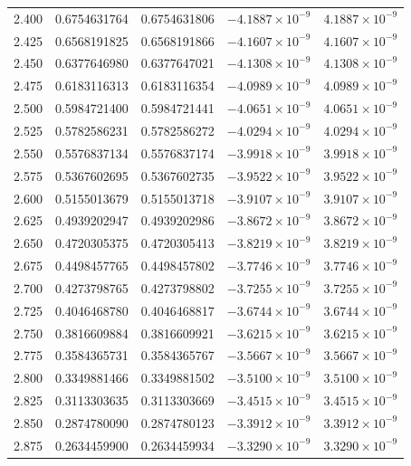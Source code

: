 \documentclass[11pt,a4paper]{article}
\begin{document}
\begin{longtable}{rrrrr}
2.400 & 0.6754631764 & 0.6754631806 & $-4.1887\times 10^{-9}$ & $4.1887\times 10^{-9}$ \\
2.425 & 0.6568191825 & 0.6568191866 & $-4.1607\times 10^{-9}$ & $4.1607\times 10^{-9}$ \\
2.450 & 0.6377646980 & 0.6377647021 & $-4.1308\times 10^{-9}$ & $4.1308\times 10^{-9}$ \\
2.475 & 0.6183116313 & 0.6183116354 & $-4.0989\times 10^{-9}$ & $4.0989\times 10^{-9}$ \\
2.500 & 0.5984721400 & 0.5984721441 & $-4.0651\times 10^{-9}$ & $4.0651\times 10^{-9}$ \\
2.525 & 0.5782586231 & 0.5782586272 & $-4.0294\times 10^{-9}$ & $4.0294\times 10^{-9}$ \\
2.550 & 0.5576837134 & 0.5576837174 & $-3.9918\times 10^{-9}$ & $3.9918\times 10^{-9}$ \\
2.575 & 0.5367602695 & 0.5367602735 & $-3.9522\times 10^{-9}$ & $3.9522\times 10^{-9}$ \\
2.600 & 0.5155013679 & 0.5155013718 & $-3.9107\times 10^{-9}$ & $3.9107\times 10^{-9}$ \\
2.625 & 0.4939202947 & 0.4939202986 & $-3.8672\times 10^{-9}$ & $3.8672\times 10^{-9}$ \\
2.650 & 0.4720305375 & 0.4720305413 & $-3.8219\times 10^{-9}$ & $3.8219\times 10^{-9}$ \\
2.675 & 0.4498457765 & 0.4498457802 & $-3.7746\times 10^{-9}$ & $3.7746\times 10^{-9}$ \\
2.700 & 0.4273798765 & 0.4273798802 & $-3.7255\times 10^{-9}$ & $3.7255\times 10^{-9}$ \\
2.725 & 0.4046468780 & 0.4046468817 & $-3.6744\times 10^{-9}$ & $3.6744\times 10^{-9}$ \\
2.750 & 0.3816609884 & 0.3816609921 & $-3.6215\times 10^{-9}$ & $3.6215\times 10^{-9}$ \\
2.775 & 0.3584365731 & 0.3584365767 & $-3.5667\times 10^{-9}$ & $3.5667\times 10^{-9}$ \\
2.800 & 0.3349881466 & 0.3349881502 & $-3.5100\times 10^{-9}$ & $3.5100\times 10^{-9}$ \\
2.825 & 0.3113303635 & 0.3113303669 & $-3.4515\times 10^{-9}$ & $3.4515\times 10^{-9}$ \\
2.850 & 0.2874780090 & 0.2874780123 & $-3.3912\times 10^{-9}$ & $3.3912\times 10^{-9}$ \\
2.875 & 0.2634459900 & 0.2634459934 & $-3.3290\times 10^{-9}$ & $3.3290\times 10^{-9}$ \\

\end{longtable}
\end{document}

